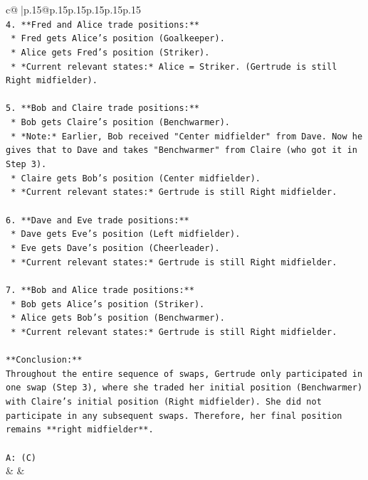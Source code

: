\documentclass{article}
\begin{document}
{\begin{supertabular}{c@{$\;$}|p{.15\linewidth}@{}p{.15\linewidth}p{.15\linewidth}p{.15\linewidth}p{.15\linewidth}p{.15\linewidth}}
{{{\\ 
\texttt{4.  **Fred and Alice trade positions:**} \\
\texttt{    *   Fred gets Alice's position (Goalkeeper).} \\
\texttt{    *   Alice gets Fred's position (Striker).} \\
\texttt{    *   *Current relevant states:* Alice = Striker. (Gertrude is still Right midfielder).} \\
\\ 
\texttt{5.  **Bob and Claire trade positions:**} \\
\texttt{    *   Bob gets Claire's position (Benchwarmer).} \\
\texttt{        *   *Note:* Earlier, Bob received "Center midfielder" from Dave. Now he gives that to Dave and takes "Benchwarmer" from Claire (who got it in Step 3).} \\
\texttt{    *   Claire gets Bob's position (Center midfielder).} \\
\texttt{    *   *Current relevant states:* Gertrude is still Right midfielder.} \\
\\ 
\texttt{6.  **Dave and Eve trade positions:**} \\
\texttt{    *   Dave gets Eve's position (Left midfielder).} \\
\texttt{    *   Eve gets Dave's position (Cheerleader).} \\
\texttt{    *   *Current relevant states:* Gertrude is still Right midfielder.} \\
\\ 
\texttt{7.  **Bob and Alice trade positions:**} \\
\texttt{    *   Bob gets Alice's position (Striker).} \\
\texttt{    *   Alice gets Bob's position (Benchwarmer).} \\
\texttt{    *   *Current relevant states:* Gertrude is still Right midfielder.} \\
\\ 
\texttt{**Conclusion:**} \\
\texttt{Throughout the entire sequence of swaps, Gertrude only participated in one swap (Step 3), where she traded her initial position (Benchwarmer) with Claire's initial position (Right midfielder). She did not participate in any subsequent swaps. Therefore, her final position remains **right midfielder**.} \\
\\ 
\texttt{A: (C)} \\
            }
        }
    }
    & & \\ \\


\end{supertabular}}
\end{document}
